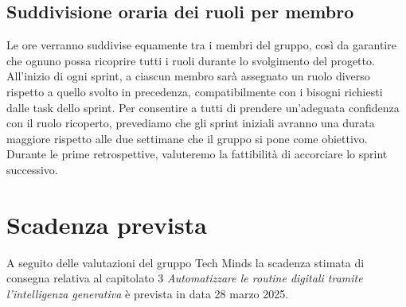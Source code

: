 \documentclass[10pt]{article}
\begin{document}
\subsection{Suddivisione oraria dei ruoli per membro}
Le ore verranno suddivise equamente tra i membri del gruppo, così da garantire che ognuno possa ricoprire tutti i ruoli durante lo svolgimento del progetto. All'inizio di ogni sprint, a ciascun membro sarà assegnato un ruolo diverso rispetto a quello svolto in precedenza, compatibilmente con i bisogni richiesti dalle task dello sprint. Per consentire a tutti di prendere un'adeguata confidenza con il ruolo ricoperto, prevediamo che gli sprint iniziali avranno una durata maggiore rispetto alle due settimane che il gruppo si pone come obiettivo. Durante le prime retrospettive, valuteremo la fattibilità di accorciare lo sprint successivo.

\section{Scadenza prevista}
A seguito delle valutazioni del gruppo Tech Minds la scadenza stimata di consegna relativa al capitolato 3 \textit{Automatizzare le routine digitali tramite l’intelligenza generativa} è prevista in data 28 marzo 2025.
\end{document}
